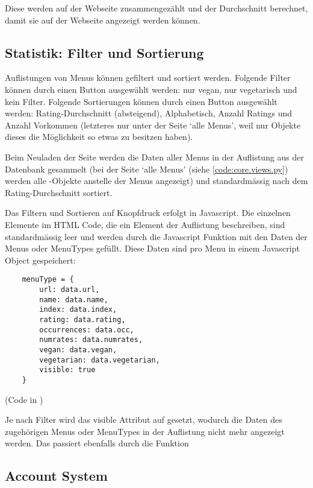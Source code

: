 Diese werden auf der Webseite zusammengezählt und der Durchschnitt berechnet,
damit sie auf der Webseite angezeigt werden können.


\subsection{Statistik: Filter und Sortierung} \label{spez:Statistik}

Auflistungen von Menus können gefiltert und sortiert werden. Folgende Filter
können durch einen Button ausgewählt werden: nur vegan, nur vegetarisch und kein
Filter. Folgende Sortierungen können durch einen Button ausgewählt werden:
Rating-Durchschnitt (absteigend), Alphabetisch, Anzahl Ratings und Anzahl
Vorkommen (letzteres nur unter der Seite `alle Menus', weil nur 
Objekte dieses die Möglichkeit so etwas zu besitzen haben).

Beim Neuladen der Seite werden die Daten aller Menus in der Auflistung aus der
Datenbank gesammelt (bei der Seite `alle Menus' (siehe \ref{code:core.views.py})
werden alle -Objekte anstelle der Menus angezeigt) und
standardmässig nach dem Rating-Durchschnitt sortiert. 

Das Filtern und Sortieren auf Knopfdruck erfolgt in Javascript. Die einzelnen
 Elemente im HTML Code, die ein Element der Auflistung beschreiben,
sind standardmässig leer und werden durch die Javascript Funktion
 mit den Daten der Menus oder MenuTypes gefüllt. Diese Daten sind pro
Menu in einem Javascript Object gespeichert:

\begin{lstlisting}
    menuType = {
        url: data.url,
        name: data.name,
        index: data.index,
        rating: data.rating,
        occurrences: data.occ,
        numrates: data.numrates,
        vegan: data.vegan,
        vegetarian: data.vegetarian,
        visible: true
    }
\end{lstlisting}

(Code in )

Je nach Filter wird das visible Attribut auf  gesetzt, wodurch die
Daten des zugehörigen Menus oder MenuTypes in der Auflistung nicht mehr
angezeigt werden. Das passiert ebenfalls durch die  Funktion

\subsection{Account System} \label{spez:Account}

